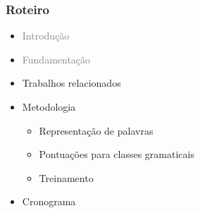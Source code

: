 \documentclass[10pt]{beamer}
\begin{document}
\begin{frame}
  \frametitle{Roteiro}


  \begin{itemize}


    
    \item[\color{gray}{$\bullet$}] \textcolor{gray}{Introdução}
    
    \begin{itemize}
    \end{itemize}


    
    \item[\color{gray}{$\bullet$}] \textcolor{gray}{Fundamentação}

    \begin{itemize}
      \color{gray}{
      \item[\ ] Aprendizado de máquina
      \item[\ ] Córpus
      \item[\ ] Representação de palavras
      \item[\ ] Redes neurais
      \item[\ ] Aprendizagem profunda
      }
    \end{itemize}


    
    \item Trabalhos relacionados

    \color{gray}
    \item[\color{gray}{$\bullet$}] Metodologia

    \begin{itemize}
      \color{gray}
      \item[\ ] Representação de palavras
      \item[\ ] Pontuações para classes gramaticais
      \item[\ ] Treinamento
    \end{itemize}

    \color{gray}
    \item[\color{gray}{$\bullet$}] Cronograma

  \end{itemize}

\end{frame}
\end{document}
